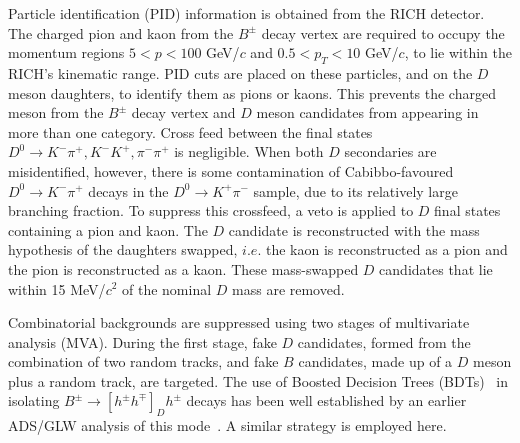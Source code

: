 \documentclass[oneside,12pt]{article}
\begin{document}
Particle identification (PID) information is obtained from the RICH detector.
The charged pion and kaon from the $B^{\pm}$ decay vertex are required to occupy
the momentum regions $5 < p < 100$ GeV/$c$ and $0.5 < p_T < 10$ GeV/$c$, to lie
within the RICH's kinematic range. PID cuts are placed on these particles, and
on the $D$ meson daughters, to identify them as pions or kaons. This prevents
the charged meson from the $B^{\pm}$ decay vertex and $D$ meson candidates from
appearing in more than one category. Cross feed between the final states
$D^{0}\rightarrow K^-\pi^+, K^-K^+, \pi^-\pi^+$ is negligible. When both $D$
secondaries are misidentified, however, there is some contamination of
Cabibbo-favoured $D^0\rightarrow K^-\pi^+$ decays in the $D^0\rightarrow
K^+\pi^-$ sample, due to its relatively large branching fraction. To suppress
this crossfeed, a veto is applied to $D$ final states containing a pion and
kaon.  The $D$ candidate is reconstructed with the mass hypothesis of the
daughters swapped, $i.e.$ the kaon is reconstructed as a pion and the pion is
reconstructed as a kaon. These mass-swapped $D$ candidates that lie within 15
MeV/$c^2$ of the nominal $D$ mass are removed. 

Combinatorial backgrounds are suppressed using two stages of multivariate
analysis (MVA). During the first stage, fake $D$ candidates, formed from the
combination of two random tracks, and fake $B$ candidates, made up of a $D$
meson plus a random track, are targeted.  The use of Boosted Decision Trees
(BDTs)~\cite{RegressionTrees} in isolating $B^{\pm}\rightarrow
[h^{\pm}h^{\mp}]_{D}h^{\pm}$ decays has been well established by an earlier 
ADS/GLW analysis of this mode~\cite{B2DKD2hh}. A similar strategy is employed
here. 
\end{document}
